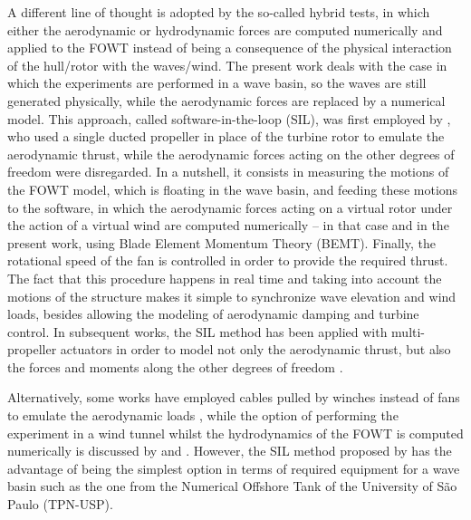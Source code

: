 A different line of thought is adopted by the so-called hybrid tests, in which either the aerodynamic or hydrodynamic forces are computed numerically and applied to the FOWT instead of being a consequence of the physical interaction of the hull/rotor with the waves/wind. The present work deals with the case in which the experiments are performed in a wave basin, so the waves are still generated physically, while the aerodynamic forces are replaced by a numerical model. This approach, called software-in-the-loop (SIL), was first employed by \citet{azcona2014aerodynamic}, who used a single ducted propeller in place of the turbine rotor to emulate the aerodynamic thrust, while the aerodynamic forces acting on the other degrees of freedom were disregarded. In a nutshell, it consists in measuring the motions of the FOWT model, which is floating in the wave basin, and feeding these motions to the software, in which the aerodynamic forces acting on a virtual rotor under the action of a virtual wind are computed numerically -- in that case and in the present work, using Blade Element Momentum Theory (BEMT). Finally, the rotational speed of the fan is controlled in order to provide the required thrust. The fact that this procedure happens in real time and taking into account the motions of the structure makes it simple to synchronize wave elevation and wind loads, besides allowing the modeling of aerodynamic damping and turbine control. In subsequent works, the SIL method has been applied with multi-propeller actuators in order to model not only the aerodynamic thrust, but also the forces and moments along the other degrees of freedom \citep{pires2020inclusion, otter2020emulating}. 

Alternatively, some works have employed cables pulled by winches instead of fans to emulate the aerodynamic loads \citep{sauder2016real, bachynski2016real, thys2018real}, while the option of performing the experiment in a wind tunnel whilst the hydrodynamics of the FOWT is computed numerically is discussed by \citet{bayati2018wind} and \citet{belloli2020hybrid}. However, the SIL method proposed by \citet{azcona2014aerodynamic} has the advantage of being the simplest option in terms of required equipment for a wave basin such as the one from the Numerical Offshore Tank of the University of São Paulo (TPN-USP). 

